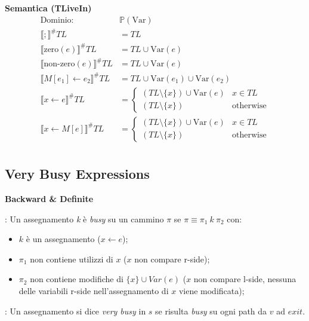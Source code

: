 \documentclass[a4paper,12pt,openany]{article}
\newcommand{\TL}{T\!L}
\newenvironment{definition}[1][Definizione]{\begin{trivlist}
\item[\hskip \labelsep {\bfseries #1}]}{\end{trivlist}}
\begin{document}
\textbf{Semantica (TLiveIn)}
\begin{align*}
\mbox{Dominio: }& \mathbb{P}(\mbox{Var})\\
\llbracket ; \rrbracket^\#\TL &= \TL\\
\llbracket \mbox{zero}(e) \rrbracket^\#\TL &= \TL \cup \mbox{Var}(e)\\
\llbracket \mbox{non-zero}(e) \rrbracket^\#\TL &= \TL \cup \mbox{Var}(e)\\
\llbracket M[e_1]\leftarrow e_2 \rrbracket^\#\TL &= \TL \cup \mbox{Var}(e_1) \cup \mbox{Var}(e_2)\\
\llbracket x \leftarrow e \rrbracket^\#\TL &=
\begin{cases}
    (\TL\setminus \{x\}) \cup \mbox{Var}(e) & x\in\TL\\
    (\TL\setminus \{x\}) & \mbox{otherwise}
\end{cases}\\
\llbracket x\leftarrow M[e] \rrbracket^\#\TL &=
\begin{cases}
    (\TL\setminus \{x\}) \cup \mbox{Var}(e) & x\in\TL\\
    (\TL\setminus \{x\}) & \mbox{otherwise}
\end{cases}\\
\end{align*}


\clearpage
\subsection{Very Busy Expressions}
\textbf{Backward \& Definite}

\begin{definition}[Busy expression]:
    Un assegnamento \textit{k} è \textit{busy} su un cammino $\pi$ se $\pi \equiv \pi_1 ~k~ \pi_2$ con:
    \begin{itemize}
    	\item $k$ è un assegnamento ($x\gets e$);
    	\item $\pi_1$ non contiene utilizzi di $x$ ($x$ non compare r-side);
    	\item $\pi_2$ non contiene modifiche di $\{x\}\cup Var(e)$ ($x$ non compare l-side, nessuna delle 
    	    variabili r-side nell'assegnamento di $x$ viene modificata);
    \end{itemize}
\end{definition}

\begin{definition}[Very busy expression]:
    Un assegnamento si dice \emph{very busy} in $s$ se risulta \emph{busy} su ogni path da $v$ ad $exit$.
\end{definition}
\end{document}
